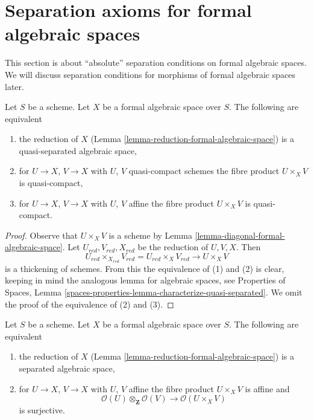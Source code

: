 \section{Separation axioms for formal algebraic spaces}
\label{section-separation}

\noindent
This section is about ``absolute'' separation conditions on formal algebraic
spaces. We will discuss separation conditions for morphisms of formal
algebraic spaces later.

\begin{lemma}
\label{lemma-characterize-quasi-separated}
Let $S$ be a scheme. Let $X$ be a formal algebraic space over $S$.
The following are equivalent
\begin{enumerate}
\item the reduction of $X$
(Lemma \ref{lemma-reduction-formal-algebraic-space}) is a
quasi-separated algebraic space,
\item for $U \to X$, $V \to X$ with $U$, $V$ quasi-compact schemes
the fibre product $U \times_X V$ is quasi-compact,
\item for $U \to X$, $V \to X$ with $U$, $V$ affine
the fibre product $U \times_X V$ is quasi-compact.
\end{enumerate}
\end{lemma}

\begin{proof}
Observe that $U \times_X V$ is a scheme by
Lemma \ref{lemma-diagonal-formal-algebraic-space}.
Let $U_{red}, V_{red}, X_{red}$ be the reduction of $U, V, X$.
Then
$$
U_{red} \times_{X_{red}} V_{red} = U_{red} \times_X V_{red} \to U \times_X V
$$
is a thickening of schemes. From this the equivalence of (1) and (2)
is clear, keeping in mind the analogous lemma for algebraic spaces, see
Properties of Spaces, Lemma
\ref{spaces-properties-lemma-characterize-quasi-separated}.
We omit the proof of the equivalence of (2) and (3).
\end{proof}

\begin{lemma}
\label{lemma-characterize-separated}
Let $S$ be a scheme. Let $X$ be a formal algebraic space over $S$.
The following are equivalent
\begin{enumerate}
\item the reduction of $X$
(Lemma \ref{lemma-reduction-formal-algebraic-space}) is a separated
algebraic space,
\item for $U \to X$, $V \to X$ with $U$, $V$ affine
the fibre product $U \times_X V$ is affine and
$$
\mathcal{O}(U) \otimes_\mathbf{Z} \mathcal{O}(V)
\longrightarrow
\mathcal{O}(U \times_X V)
$$
is surjective.
\end{enumerate}
\end{lemma}

